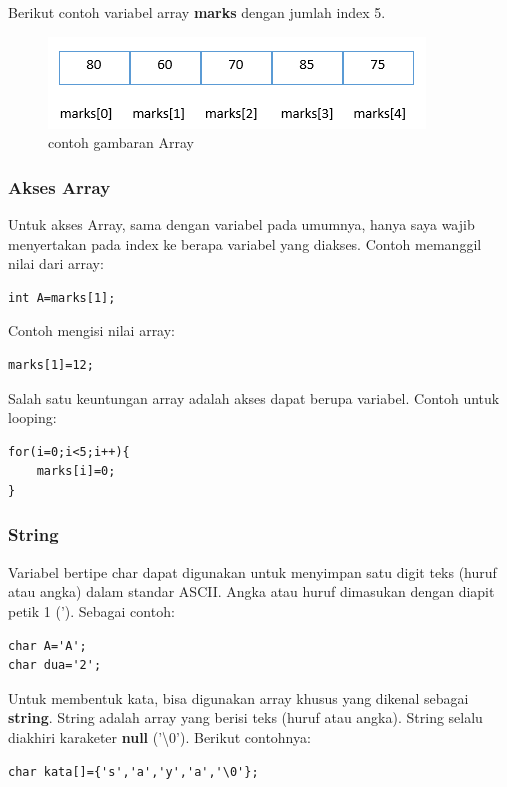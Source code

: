 \documentclass[12pt,]{article}
\begin{document}
	Berikut contoh variabel array \textbf{marks} dengan jumlah index 5.
	
	\begin{figure}[H]
		\centering
		\includegraphics[width=0.35\linewidth]{images/array}
		\caption{contoh gambaran Array}
	\end{figure}
	
	\subsubsection{Akses Array}
	
	Untuk akses Array, sama dengan variabel pada umumnya, hanya saya wajib menyertakan pada index ke berapa variabel yang diakses.
	Contoh memanggil nilai dari array:
	\begin{verbatim}
int A=marks[1];
	\end{verbatim}
	
	Contoh mengisi nilai array:
	\begin{verbatim}
marks[1]=12;
	\end{verbatim}
	
	Salah satu keuntungan array adalah akses dapat berupa variabel.
	Contoh untuk looping:
	\begin{verbatim}
for(i=0;i<5;i++){
	marks[i]=0;
}
	\end{verbatim}
	
	\subsubsection{String}
	
	Variabel bertipe char dapat digunakan untuk menyimpan satu digit teks (huruf atau angka) dalam standar ASCII.
	Angka atau huruf dimasukan dengan diapit petik 1 (').
	Sebagai contoh:
	\begin{verbatim}
char A='A';
char dua='2';
	\end{verbatim}
	
	Untuk membentuk kata, bisa digunakan array khusus yang dikenal sebagai \textbf{string}.
	String adalah array yang berisi teks (huruf atau angka).
	String selalu diakhiri karaketer \textbf{null} ('\textbackslash0').
	Berikut contohnya:
	\begin{verbatim}
char kata[]={'s','a','y','a','\0'};
	\end{verbatim}
	
\end{document}
